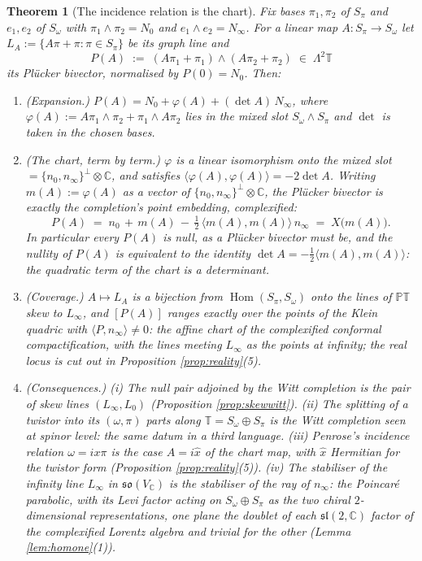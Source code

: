 \documentclass[11pt]{article}
\newtheorem{theorem}{Theorem}[section]
\theoremstyle{definition}
\newcommand{\C}{\mathbb{C}}
\newcommand{\T}{\mathbb{T}}
\newcommand{\PT}{\mathbb{PT}}
\newcommand{\nO}{n_0}
\newcommand{\nInf}{n_\infty}
\newcommand{\ip}[2]{\langle #1, #2\rangle}
\newcommand{\Som}{S_\omega}
\newcommand{\Spi}{S_\pi}
\begin{document}
\begin{theorem}[The incidence relation is the chart]\label{thm:incidence}
Fix bases $\pi_1, \pi_2$ of $\Spi$ and $e_1, e_2$ of $\Som$ with $\pi_1\wedge\pi_2 = N_0$ and $e_1 \wedge e_2 = N_\infty$. For a linear map $A: \Spi \to \Som$ let $L_A := \{A\pi + \pi : \pi \in \Spi\}$ be its graph line and
\[
P(A) \;:=\; (A\pi_1 + \pi_1)\wedge(A\pi_2 + \pi_2) \;\in\; \Lambda^2\T
\]
its Pl\"ucker bivector, normalised by $P(0) = N_0$. Then:
\begin{enumerate}
\item \emph{(Expansion.)} $P(A) = N_0 + \varphi(A) + (\det A)\, N_\infty$, where $\varphi(A) := A\pi_1\wedge\pi_2 + \pi_1\wedge A\pi_2$ lies in the mixed slot $\Som\wedge\Spi$ and $\det$ is taken in the chosen bases.
\item \emph{(The chart, term by term.)} $\varphi$ is a linear isomorphism onto the mixed slot $= \{\nO,\nInf\}^\perp \otimes \C$, and satisfies $\ip{\varphi(A)}{\varphi(A)} = -2\det A$. Writing $m(A) := \varphi(A)$ as a vector of $\{\nO,\nInf\}^\perp\otimes\C$, the Pl\"ucker bivector is exactly the completion's point embedding, complexified:
\[
P(A) \;=\; \nO \,+\, m(A)\,-\,\tfrac12\,\ip{m(A)}{m(A)}\,\nInf \;=\; X\bigl(m(A)\bigr).
\]
In particular every $P(A)$ is null, as a Pl\"ucker bivector must be, and the nullity of $P(A)$ is equivalent to the identity $\det A = -\tfrac12\ip{m(A)}{m(A)}$: the quadratic term of the chart is a determinant.
\item \emph{(Coverage.)} $A \mapsto L_A$ is a bijection from $\operatorname{Hom}(\Spi, \Som)$ onto the lines of $\PT$ skew to $L_\infty$, and $[P(A)]$ ranges exactly over the points of the Klein quadric with $\ip{P}{\nInf} \neq 0$: the affine chart of the complexified conformal compactification, with the lines meeting $L_\infty$ as the points at infinity; the real locus is cut out in Proposition \ref{prop:reality}(5).
\item \emph{(Consequences.)} (i) The null pair adjoined by the Witt completion is the pair of skew lines $(L_\infty, L_0)$ (Proposition \ref{prop:skewwitt}). (ii) The splitting of a twistor into its $(\omega, \pi)$ parts along $\T = \Som\oplus\Spi$ is the Witt completion seen at spinor level: the same datum in a third language. (iii) Penrose's incidence relation $\omega = ix\pi$ is the case $A = i\hat x$ of the chart map, with $\hat x$ Hermitian for the twistor form (Proposition \ref{prop:reality}(5)). (iv) The stabiliser of the infinity line $L_\infty$ in $\mathfrak{so}(V_\C)$ is the stabiliser of the ray of $\nInf$: the Poincar\'e parabolic, with its Levi factor acting on $\Som \oplus \Spi$ as the two chiral $2$-dimensional representations, one plane the doublet of each $\mathfrak{sl}(2,\C)$ factor of the complexified Lorentz algebra and trivial for the other (Lemma \ref{lem:homone}(1)).
\end{enumerate}
\end{theorem}
\end{document}
